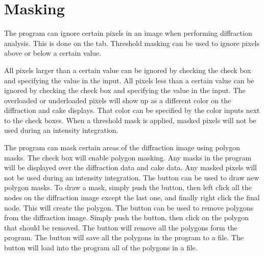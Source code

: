 \section{Masking}

The program can ignore certain pixels in an image
when performing diffraction analysis. This is done 
on the  tab.  Threshold masking can be 
used to ignore pixels above or below a certain value.

All pixels larger than a certain value can be ignored by
checking the  check box
and specifying the value in the 
 input.
All pixels less than a certain value can be ignored by
checking the  check box 
and specifying the value in the 
 input.
The overloaded or underloaded pixels will show up
as a different color on the diffraction and cake displays.
That color can be specified by the color inputs next to the 
check boxes. When a threshold mask is applied, masked pixels
will not be used during an intensity integration.

The program can mask certain areas of the diffraction image
using polygon masks. The  check box 
will enable polygon masking. Any masks in the program
will be displayed over the diffraction data and cake data.
Any masked pixels will not be used during an intensity
integration. The  button can be used to 
draw new polygon masks. To draw a mask, simply push
the button, then left click all the
nodes on the diffraction image except the last one, and
finally right click the final node. This will create the 
polygon. The  button can be used to 
remove polygons from the diffraction image. Simply push
the button, then click on the polygon that should be
removed. The  button will remove all
the polygons form the program. The  button
will save all the polygons in the program to a file.
The  button will load into the program
all of the polygons in a file.

